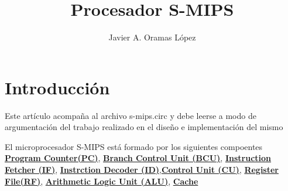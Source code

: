 \documentclass{article}
\author{Javier A. Oramas L\'opez}
\title{Procesador S-MIPS}
\begin{document}
    
    \maketitle

    \section{Introducci\'on}
        Este art\'iculo acompa\~na al archivo s-mips.circ y debe leerse a modo de argumentaci\'on del trabajo realizado en el dise\~no e implementaci\'on del mismo

        El microprocesador S-MIPS est\'a formado por los siguientes compoentes \hyperref[sec:PC]{\textbf{Program Counter(PC)}},
        \hyperref[sec:BCU]{\textbf{Branch Control Unit (BCU)}}, \hyperref[sec:IF]{\textbf{Instruction Fetcher (IF)}}, 
        \hyperref[sec:ID]{\textbf{Instrction Decoder (ID)}},\hyperref[sec:CU]{\textbf{Control Unit (CU)}}, \hyperref[sec:RF]{\textbf{Register File(RF)}},
        \hyperref[sec:ALU]{\textbf{Arithmetic Logic Unit (ALU)}}, \hyperref[sec:Cache]{\textbf{Cache}}
    
\end{document}
